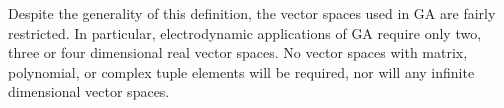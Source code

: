 %
Despite the generality of this definition, the vector spaces used in GA are fairly restricted.
In particular, electrodynamic applications of GA require only two, three or four dimensional real vector spaces.
No vector spaces with matrix, polynomial, or complex tuple elements will be required, nor will any
infinite dimensional vector spaces.



